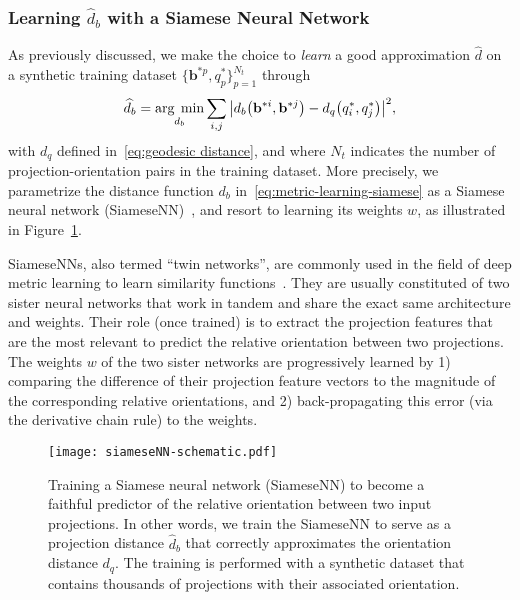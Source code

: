 \subsubsection{Learning $\widehat{d}_b$ with a Siamese Neural Network}

As previously discussed, we make the choice to \textit{learn} a good approximation $\widehat{d}$ on a synthetic training dataset $\big\{ \mathbf{b}^{*p}, q^*_p\big\}_{p=1}^{N_t}$ through
\begin{equation}
    \label{eq:metric-learning-siamese}
    \widehat{d}_b=\underset{d_b}{\arg\;\min}\sum_{i,j} \big|d_b\big(\mathbf{b}^{*i},\mathbf{b}^{*j}\big) - d_q\big(q^*_i,q^*_j\big) \big|^2,
\end{equation}
with $d_q$ defined in~\eqref{eq:geodesic distance}, and where $N_t$ indicates the number of projection-orientation pairs in the training dataset. More precisely, we parametrize the distance function $d_b$ in~\eqref{eq:metric-learning-siamese} as a Siamese neural network (SiameseNN)~\cite{chopra2005learning}, and resort to learning its weights $w$, as illustrated in Figure~\ref{fig:siamese-schematic}.

SiameseNNs, also termed ``twin networks'', are commonly used in the field of deep metric learning to learn similarity functions~\cite{yi2014deep}. They are usually constituted of two sister neural networks that work in tandem and share the exact same architecture and weights.  Their role (once trained) is to extract the projection features that are the most relevant to predict the relative orientation between two projections. The weights $w$ of the two sister networks are progressively learned by 1) comparing the difference of their projection feature vectors to the magnitude of the corresponding relative orientations, and 2) back-propagating this error (via the derivative chain rule) to the weights.

\begin{figure}[t!]
    \centering
    \texttt{[image: siameseNN-schematic.pdf]}
    \caption{Training a Siamese neural network (SiameseNN) to become a faithful predictor of the relative orientation between two input projections. In other words, we train the SiameseNN to serve as a projection distance $\widehat{d}_b$ that correctly approximates the orientation distance $d_q$. The training is performed with a synthetic dataset that contains thousands of projections with their associated orientation.}
    \label{fig:siamese-schematic}
\end{figure}

